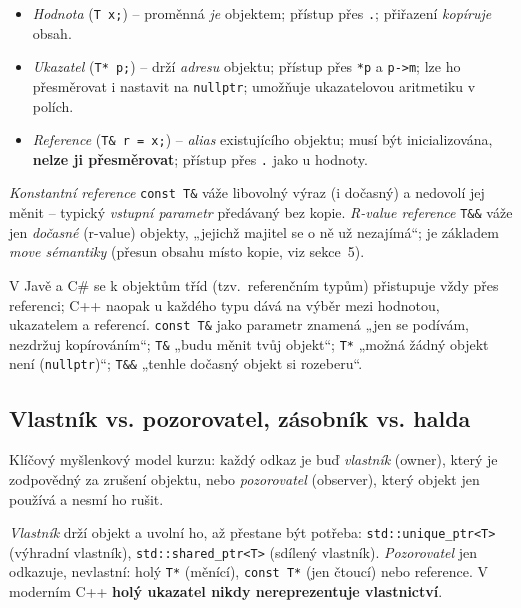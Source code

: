 \documentclass[11pt,a4paper]{article}
\newcommand{\cd}{\lstinline[style=cpp]}
\begin{document}
\begin{definice}
\begin{itemize}
  \item \emph{Hodnota} (\cd{T x;}) -- proměnná \emph{je} objektem; přístup přes \cd{.}; přiřazení \emph{kopíruje} obsah.
  \item \emph{Ukazatel} (\cd{T* p;}) -- drží \emph{adresu} objektu; přístup přes \cd{*p} a \cd{p->m}; lze ho přesměrovat i nastavit na \cd{nullptr}; umožňuje ukazatelovou aritmetiku v polích.
  \item \emph{Reference} (\cd{T& r = x;}) -- \emph{alias} existujícího objektu; musí být inicializována, \textbf{nelze ji přesměrovat}; přístup přes \cd{.} jako u hodnoty.
\end{itemize}
\end{definice}

\begin{definice}
\emph{Konstantní reference} \cd{const T&} váže libovolný výraz (i dočasný) a nedovolí jej měnit -- typický \emph{vstupní parametr} předávaný bez kopie. \emph{R-value reference} \cd{T&&} váže jen \emph{dočasné} (r-value) objekty, „jejichž majitel se o ně už nezajímá``; je základem \emph{move sémantiky} (přesun obsahu místo kopie, viz sekce~5).
\end{definice}

\begin{intuice}
V Javě a C\# se k objektům tříd (tzv.\ referenčním typům) přistupuje vždy přes referenci; C++ naopak u každého typu dává na výběr mezi hodnotou, ukazatelem a referencí. \cd{const T&} jako parametr znamená „jen se podívám, nezdržuj kopírováním``; \cd{T&} „budu měnit tvůj objekt``; \cd{T*} „možná žádný objekt není (\texttt{nullptr})``; \cd{T&&} „tenhle dočasný objekt si rozeberu``.
\end{intuice}

\subsection{Vlastník vs. pozorovatel, zásobník vs. halda}

Klíčový myšlenkový model kurzu: každý odkaz je buď \emph{vlastník} (owner), který je zodpovědný za zrušení objektu, nebo \emph{pozorovatel} (observer), který objekt jen používá a nesmí ho rušit.

\begin{definice}
\emph{Vlastník} drží objekt a uvolní ho, až přestane být potřeba: \cd{std::unique_ptr<T>} (výhradní vlastník), \cd{std::shared_ptr<T>} (sdílený vlastník). \emph{Pozorovatel} jen odkazuje, nevlastní: holý \cd{T*} (měnící), \cd{const T*} (jen čtoucí) nebo reference. V moderním C++ \textbf{holý ukazatel nikdy nereprezentuje vlastnictví}.
\end{definice}
\end{document}
